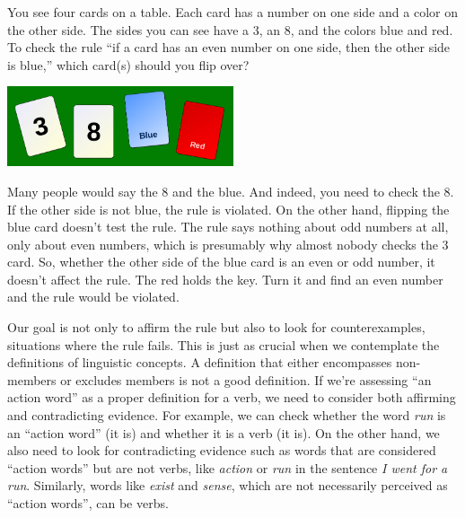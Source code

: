 \begin{tcolorbox}[float*, title=A thinking trap, colback=white]
    You see four cards on a table. Each card has a number on one side and a color on the other side. The sides you can see have a 3, an 8, and the colors blue and red. To check the rule ``if a card has an even number on one side, then the other side is blue,'' which card(s) should you flip over?
    \begin{center}
        \includegraphics[width=0.5\textwidth]{figures/wason.png}
        \tiny {}
    \end{center}
    Many people would say the 8 and the blue. And indeed, you need to check the 8. If the other side is not blue, the rule is violated. On the other hand, flipping the blue card doesn't test the rule. The rule says nothing about odd numbers at all, only about even numbers, which is presumably why almost nobody checks the 3 card. So, whether the other side of the blue card is an even or odd number, it doesn't affect the rule. The red holds the key. Turn it and find an even number and the rule would be violated.

    Our goal is not only to affirm the rule but also to look for counterexamples, situations where the rule fails. This is just as crucial when we contemplate the definitions of linguistic concepts. A definition that either encompasses non-members or excludes members is not a good definition. If we're assessing ``an action word'' as a proper definition for a verb, we need to consider both affirming and contradicting evidence. For example, we can check whether the word \textit{run} is an ``action word'' (it is) and whether it is a verb (it is). On the other hand, we also need to look for contradicting evidence such as words that are considered ``action words'' but are not verbs, like \textit{action} or \textit{run} in the sentence \textit{I went for a run}. Similarly, words like \textit{exist} and \textit{sense}, which are not necessarily perceived as ``action words'', can be verbs.
    
\end{tcolorbox}

